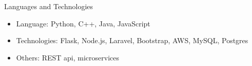 \documentclass[]{mcdowellcv}
\begin{document}
		
	
	\begin{cvsection}{Languages and Technologies}
		\begin{cvsubsection}{}{}{}	
			\begin{itemize}
				\item Language: Python, C++, Java, JavaScript
				\item Technologies: Flask, Node.js, Laravel, Bootstrap, AWS, MySQL, Postgres
				\item Others: REST api, microservices
			\end{itemize}
		\end{cvsubsection}
	\end{cvsection}
	
	
\end{document}
